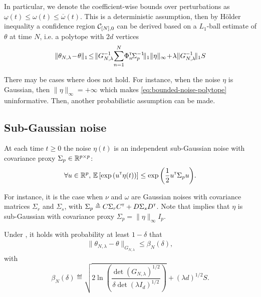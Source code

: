 In particular, we denote the coefficient-wise bounds over perturbations as $\underline{\omega}(t) \leq \omega(t) \leq \overline{\omega}(t)$. This is a deterministic assumption, then by Hölder inequality a confidence region $\mathcal{C}_{[N],0}$ can be derived based on a $L_1$-ball estimate of $\theta$ at time $N$, i.e. a polytope with $2d$ vertices
\begin{equation}
\label{eq:bounded-noise-polytope}
\|\theta_{N,\lambda}\! -\! \theta\|_1\! \leq \! \|G_{N, \lambda}^{-1}\!\sum_{n=1}^N \!\Phi_n^\transp\! \Sigma_p^{-1}\!\|_1\|\eta\|_\infty\! +\!\lambda\|G_{N, \lambda}^{-1}\!\|_1S
\end{equation}

There may be cases where  does not hold. For instance, when the noise $\eta$ is Gaussian, then $\|\eta\|_\infty=+\infty$ which makes \eqref{eq:bounded-noise-polytope} uninformative. Then, another probabilistic assumption can be made.

\subsection{Sub-Gaussian noise}

\begin{assumption}
	\label{assumpt:gaussian-noise}
	\begin{leftbar}[assumptionbar]
	At each time $t\geq0$ the noise $\eta(t)$ is an independent sub-Gaussian noise with covariance proxy $\Sigma_p \in \mathbb{R}^{p\times p}$:
	\begin{equation*}
	\forall u\in\mathbb{R}^p,\, \operatorname*{\mathbb{E}} \left[ \exp{\left( u^{\mathsf{\scriptscriptstyle T}}\eta(t)\right)}\right] \leq \exp{\left( \frac{1}{2} u^{\mathsf{\scriptscriptstyle T}}\Sigma_p u\right)}.
	\end{equation*}
	\end{leftbar}
\end{assumption}
For instance, it is the case when $\nu$ and $\omega$ are Gaussian noises with covariance matrices $\Sigma_r$ and $\Sigma_s$, with $\Sigma_p \eqdef C\Sigma_r C^\transp + D\Sigma_s D^\transp$. Note that  implies that $\eta$ is sub-Gaussian with covariance proxy $\Sigma_p=\|\eta\|_\infty I_p$.

\begin{theorem}
	\label{thm:confidence_ellipsoid}
	\begin{leftbar}[theorembar]
	Under , it holds with probability at least $1-\delta$ that
	\begin{align}
	\label{eq:confidence-ellipsoid}
	\| \theta_{N,\lambda}  - \theta\|_{G_{N,\lambda}} \leq \beta_N(\delta),
	\end{align}
	with
	\begin{equation}
	\label{eq:beta_n}
	\beta_N(\delta)\eqdef \sqrt{2\ln \left(\frac{\det(G_{N,\lambda})^{1/2}}{\delta\det(\lambda I_d)^{1/2}}\right)}
	+ (\lambda d)^{1/2}S.
	\end{equation}
	\end{leftbar}
\end{theorem}


